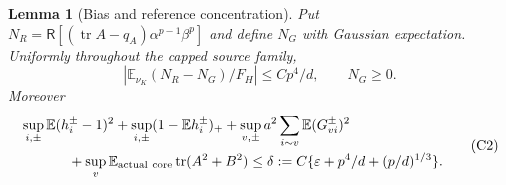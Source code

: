 \documentclass[10pt]{article}
\numberwithin{equation}{section}
\newtheorem{lemma}{Lemma}[section]
\newcommand{\1}{\mathbf1}
\begin{document}
\begin{lemma}[Bias and reference concentration]\label{cu:concentration}
Put $N_R=\mathsf R[(\operatorname{tr}A-q_A)\alpha^{p-1}\beta^p]$
and define $N_G$ with Gaussian expectation. Uniformly throughout the
capped source family,
\[
 \left|\mathbb E_{\nu_K}(N_R-N_G)/F_H\right|\le Cp^4/d,
 \qquad N_G\ge0. \tag{C1}\label{cu:C1}
\]
Moreover
\[
 \begin{split}
 &\sup_{i,\pm}\mathbb E(h_i^\pm-1)^2
  +\sup_{i,\pm}(1-\mathbb Eh_i^\pm)_+
  +\sup_{v,\pm}a^2\sum_{i\sim v}\mathbb E(G^\pm_{vi})^2\\
 &\hspace{12mm}
  +\sup_v\mathbb E_{\rm actual\ core}\operatorname{tr}(A^2+B^2)
       \le\delta:=C\{\varepsilon+p^4/d+(p/d)^{1/3}\}.
 \end{split} \tag{C2}\label{cu:C2}
\]
\end{lemma}
\end{document}

